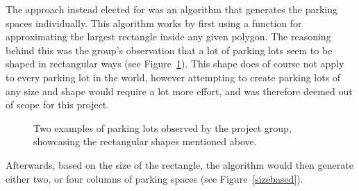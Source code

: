 The approach instead elected for was an algorithm that generates the parking spaces individually.
This algorithm works by first using a function for approximating the largest rectangle inside any given polygon. 
The reasoning behind this was the group's observation that a lot of parking lots seem to be shaped in rectangular ways (see Figure~\ref{fig:parkings}).
This shape does of course not apply to every parking lot in the world, however attempting to create parking lots of any size and shape would require a lot more effort, and was therefore deemed out of scope for this project. 
\begin{figure}[H]
  \centering
  \begin{subfigure}[b]{0.56\textwidth}
  \end{subfigure}
  \quad
  \begin{subfigure}[b]{0.395\textwidth}
  \end{subfigure}

  \caption{Two examples of parking lots observed by the project group, showcasing the rectangular shapes mentioned above.}
  \label{fig:parkings}
\end{figure}
Afterwards, based on the size of the rectangle, the algorithm would then generate either two, or four columns of parking spaces (see Figure~\ref{sizebased}).
